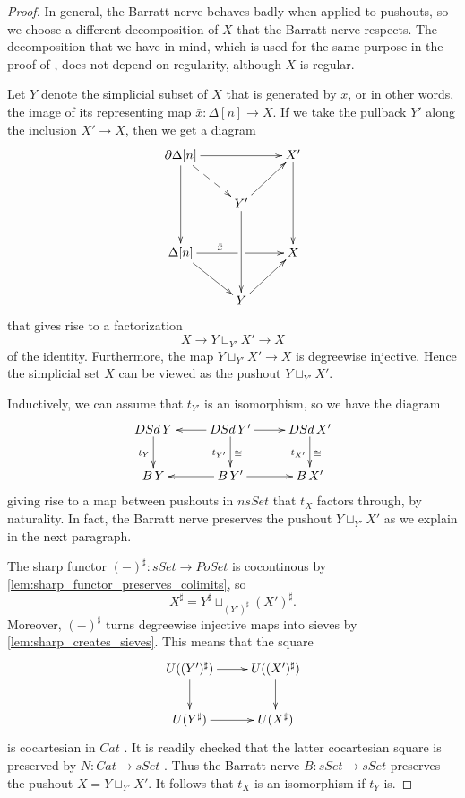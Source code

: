 \begin{proof}
In general, the Barratt nerve behaves badly when applied to pushouts, so we choose a different decomposition of $X$ that the Barratt nerve respects. The decomposition that we have in mind, which is used for the same purpose in the proof of \cite[Prop.~2.5.8]{WJR13}, does not depend on regularity, although $X$ is regular.

Let $Y$ denote the simplicial subset of $X$ that is generated by $x$, or in other words, the image of its representing map $\bar{x} :\Delta [n]\to X$. If we take the pullback $Y'$ along the inclusion $X'\to X$, then we get a diagram
\begin{displaymath}
\xymatrix{
\partial \Delta [n] \ar[dd] \ar@{-->}[dr] \ar[rr] && X' \ar[dd] \\
& Y' \ar[dd] \ar[ur] \\
\Delta [n] \ar[dr] \ar@{-}[r]^(.65){\bar{x} } & \ar[r] & X \\
& Y \ar[ur]
}
\end{displaymath}
that gives rise to a factorization
\[X\to Y\sqcup _{Y'}X'\to X\]
of the identity. Furthermore, the map $Y\sqcup _{Y'}X'\to X$ is degreewise injective. Hence the simplicial set $X$ can be viewed as the pushout $Y\sqcup _{Y'}X'$.

Inductively, we can assume that $t_{Y'}$ is an isomorphism, so we have the diagram
\begin{displaymath}
\xymatrix{
DSd\, Y \ar[d]_{t_Y} & DSd\, Y' \ar[l] \ar[d]_{t_{Y'}}^\cong \ar[r] & DSd\, X' \ar[d]_{t_{X'}}^\cong \\
B\, Y & B\, Y' \ar[l] \ar[r] & B\, X'
}
\end{displaymath}
giving rise to a map between pushouts in $nsSet$ that $t_X$ factors through, by naturality. In fact, the Barratt nerve preserves the pushout $Y\sqcup _{Y'}X'$ as we explain in the next paragraph.

The sharp functor $(-)^\sharp :sSet\to PoSet$ is cocontinous by \cref{lem:sharp_functor_preserves_colimits}, so
\[X^\sharp =Y^\sharp \sqcup _{(Y')^\sharp}(X')^\sharp.\]
Moreover, $(-)^\sharp$ turns degreewise injective maps into sieves by \cref{lem:sharp_creates_sieves}. This means that the square
\begin{displaymath}
\xymatrix{
	U((Y')^\sharp ) \ar[d] \ar[r] & U((X')^\sharp ) \ar[d] \\
	U(Y^\sharp ) \ar[r] & U(X^\sharp )
}
\end{displaymath}
is cocartesian in $Cat$ \cite[p.~315]{Th80}. It is readily checked that the latter cocartesian square is preserved by $N:Cat\to sSet$ \cite[p.~315]{Th80}. Thus the Barratt nerve $B:sSet\to sSet$ preserves the pushout $X=Y\sqcup _{Y'}X'$. It follows that $t_X$ is an isomorphism if $t_Y$ is.


\end{proof}
